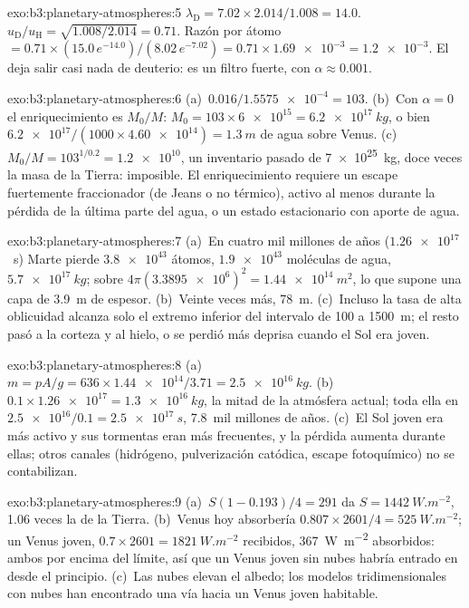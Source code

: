\begin{solution}{exo:b3:planetary-atmospheres:5}
$\lambda_\mathrm D = 7.02\times2.014/1.008 = 14.0$. $u_\mathrm D/u_\mathrm H
= \sqrt{1.008/2.014} = 0.71$. Razón por átomo $= 0.71\times(15.0\,
e^{-14.0})/(8.02\,e^{-7.02}) = 0.71\times\num{1.69e-3} = \num{1.2e-3}$.
El  deja salir casi nada de deuterio: es un filtro fuerte, con
$\alpha \approx 0.001$.
\end{solution}

\begin{solution}{exo:b3:planetary-atmospheres:6}
(a)~$0.016/\num{1.5575e-4} = 103$. (b)~Con $\alpha = 0$ el enriquecimiento es
$M_0/M$: $M_0 = 103\times\num{6e15} = \qty{6.2e17}{kg}$, o bien
$\num{6.2e17}/(1000\times\num{4.60e14}) = \qty{1.3}{m}$ de agua sobre
Venus. (c)~$M_0/M = 103^{1/0.2} = \num{1.2e10}$, un inventario pasado de
\qty{7e25}{kg}, doce veces la masa de la Tierra: imposible. El
enriquecimiento requiere un escape fuertemente fraccionador (de Jeans o no térmico),
activo al menos durante la pérdida de la última parte del agua, o un
estado estacionario con aporte de agua.
\end{solution}

\begin{solution}{exo:b3:planetary-atmospheres:7}
(a)~En cuatro mil millones de años ($\num{1.26e17}$~s) Marte pierde
$\num{3.8e43}$ átomos, $\num{1.9e43}$ moléculas de agua, $\qty{5.7e17}{kg}$;
sobre $4\pi(\num{3.3895e6})^2 = \qty{1.44e14}{m^2}$, lo que supone una capa
de \qty{3.9}{m} de espesor. (b)~Veinte veces más, \qty{78}{m}. (c)~Incluso la
tasa de alta oblicuidad alcanza solo el extremo inferior del intervalo de 100 a
\qty{1500}{m}; el resto pasó a la corteza y al hielo, o se perdió
más deprisa cuando el Sol era joven.
\end{solution}

\begin{solution}{exo:b3:planetary-atmospheres:8}
(a)~$m = pA/g = 636\times\num{1.44e14}/3.71 = \qty{2.5e16}{kg}$.
(b)~$0.1\times\num{1.26e17} = \qty{1.3e16}{kg}$, la mitad de la
atmósfera actual; toda ella en $\num{2.5e16}/0.1 = \qty{2.5e17}{s}$,
\num{7.8}~mil millones de años. (c)~El Sol joven era más activo y sus
tormentas eran más frecuentes, y la pérdida aumenta durante ellas; otros canales
(hidrógeno, pulverización catódica, escape fotoquímico) no se contabilizan.
\end{solution}

\begin{solution}{exo:b3:planetary-atmospheres:9}
(a)~$S(1 - 0.193)/4 = 291$ da $S = \qty{1442}{W.m^{-2}}$, 1.06 veces
la de la Tierra. (b)~Venus hoy absorbería $0.807\times2601/4 =
\qty{525}{W.m^{-2}}$; un Venus joven, $0.7\times2601 = \qty{1821}{W.m^{-2}}$
recibidos, \qty{367}{W.m^{-2}} absorbidos: ambos por encima del límite, así que un
Venus joven sin nubes habría entrado en  desde el principio. (c)~Las nubes
elevan el albedo; los modelos tridimensionales con nubes han encontrado una vía
hacia un Venus joven habitable.
\end{solution}

